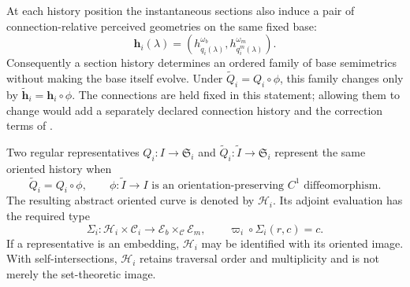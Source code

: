 At each history position the instantaneous sections also induce a pair of
connection-relative perceived geometries on the same fixed base:
\begin{equation}
\mathbf h_i(\lambda)
=\left(
h_{q_i(\lambda)}^{\omega_b},
h_{q_i^m(\lambda)}^{\omega_m}
\right).
\label{eq:hist-perceived-geometry-family}
\end{equation}
Consequently a section history determines an ordered family of base
semimetrics without making the base itself evolve.  Under
$\widetilde Q_i=Q_i\circ\phi$, this family changes only by
$\widetilde{\mathbf h}_i=\mathbf h_i\circ\phi$.  The connections are held
fixed in this statement; allowing them to change would add a separately
declared connection history and the correction terms of
. 

Two regular representatives $Q_i:I\to\mathfrak S_i$ and
$\widetilde Q_i:\widetilde I\to\mathfrak S_i$ represent the same oriented
history when
\begin{equation}
\widetilde Q_i=Q_i\circ\phi,
\qquad
\phi:\widetilde I\longrightarrow I
\text{ is an orientation-preserving $C^1$ diffeomorphism}.
\label{eq:hist-oriented-reparameterization-equivalence}
\end{equation}
The resulting abstract oriented curve is denoted by $\mathscr H_i$.  Its
adjoint evaluation has the required type
\begin{equation}
\Sigma_i:\mathscr H_i\times\mathcal C_i
\longrightarrow
\mathcal E_b\times_{\mathcal C}\mathcal E_m,
\qquad
\varpi_i\circ\Sigma_i(r,c)=c.
\label{eq:hist-adjoint-unparameterized-history}
\end{equation}
If a representative is an embedding, $\mathscr H_i$ may be identified with
its oriented image.  With self-intersections, $\mathscr H_i$ retains
traversal order and multiplicity and is not merely the set-theoretic image.

